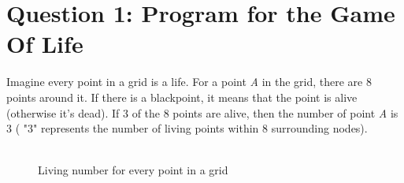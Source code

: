\documentclass[]{article}
\begin{document}
\maketitle
\section{Question 1: Program for the Game Of Life}

Imagine every point in a grid is a life. For a point \textit{A} in the grid, 
there are 8 points around it. If there is a blackpoint, it means 
that the point is alive (otherwise it's dead). If 3 of the 8 points are alive, then the 
number of point 
\textit{A} is 3 ( "3" represents the number of living points within 8 surrounding nodes).\\

\\

\begin{figure} 
    \centering 
        \caption{Living number for every point in a grid} 
    \label{fig::label10}
\end{figure}

\end{document}
